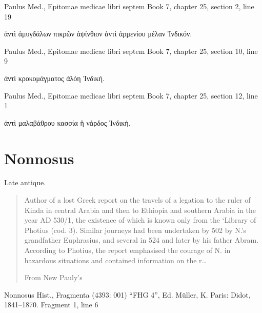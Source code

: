 \documentclass[12pt,letterpaper,twoside,final]{memoir}
\begin{document}
\begin{greek}
Paulus Med., Epitomae medicae libri septem 
Book 7, chapter 25, section 2, line 19

ἀντὶ ἀμυγδάλων πικρῶν ἀψίνθιον 
 ἀντὶ ἀρμενίου μέλαν Ἰνδικόν. 



Paulus Med., Epitomae medicae libri septem 
Book 7, chapter 25, section 10, line 9

ἀντὶ κροκομάγματος ἀλόη Ἰνδική. 



Paulus Med., Epitomae medicae libri septem 
Book 7, chapter 25, section 12, line 1

ἀντὶ μαλαβάθρου κασσία ἢ νάρδος Ἰνδική. 

\end{greek}

\section{Nonnosus}

Late antique.

\blockquote[From New Pauly's]{Author of a lost Greek report on the travels of a legation to the ruler of Kinda in central Arabia and then to Ethiopia and southern Arabia in the year AD 530/1, the existence of which is known only from the  ‘Library of Photius (cod. 3). Similar journeys had been undertaken by 502 by N.'s grandfather Euphrasius, and several in 524 and later by his father Abram. According to Photius, the report emphasised the courage of N. in hazardous situations and contained information on the r…}


Nonnosus Hist., Fragmenta (4393: 001)
“FHG 4”, Ed. Müller, K.
Paris: Didot, 1841–1870.
Fragment 1, line 6
\end{document}
